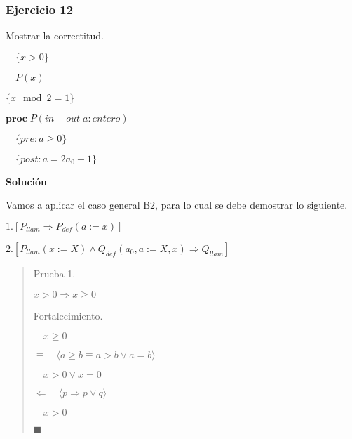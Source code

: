 \documentclass[hidelinks]{article}
\newenvironment{absolutelynopagebreak}
{\Needspace{10\baselineskip}\begin{quote}}
		{\end{quote}}
\begin{document}
\subsubsection{Ejercicio 12}


Mostrar la correctitud.\par

$\quad \{x > 0\}$ \par
$\quad P(x)$ \par
$\{ x \mod 2 = 1\}$ \par

$\textbf{proc} \; P(in-out \; a: entero)$ \par
$\quad \{pre: a \geq 0\}$ \par
$\quad \{post: a = 2a_0+1\}$\par

\textbf{Solución}\par

Vamos a aplicar el caso general B2, para lo cual se debe demostrar lo
siguiente.\par

$1. [P_{llam} \Rightarrow P_{def}(a := x)]$\par
$2. [P_{llam}(x := X) \land Q_{def}(a_0,a := X, x) \Rightarrow Q_{llam}]$\par

\begin{absolutelynopagebreak}
	Prueba 1.\par
	$x > 0 \Rightarrow x \geq 0$\par

	Fortalecimiento.\par
	$\quad x \geq 0$\par
	$\equiv \quad \langle a \geq b \equiv a > b \lor a = b \rangle$\par
	$\quad x > 0 \lor x = 0$\par
	$\Leftarrow \quad \langle p \Rightarrow p \lor q \rangle$\par
	$\quad x > 0$\par
	$\blacksquare$\par
\end{absolutelynopagebreak}
\end{document}
